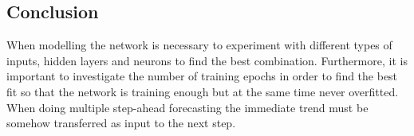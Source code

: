 \subsection{Conclusion}
When modelling the network is necessary to experiment with different types of inputs, hidden layers and neurons to find the best combination. Furthermore, it is important to investigate the number of training epochs in order to find the best fit so that the network is training enough but at the same time never overfitted. 
When doing multiple step-ahead forecasting the immediate trend must be somehow transferred as input to the next step. 